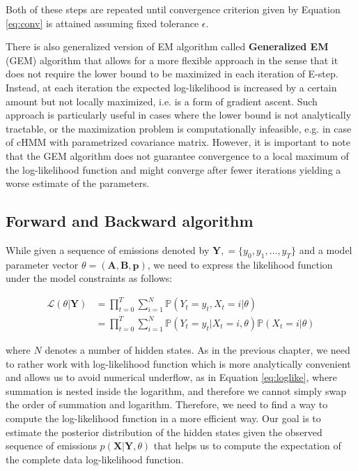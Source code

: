 Both of these steps are repeated until convergence criterion given by Equation \ref{eq:conv} is attained assuming fixed tolerance $\epsilon$.

There is also generalized version of EM algorithm called \textbf{Generalized EM} (GEM) algorithm that allows for a more flexible approach
in the sense that it does not require the lower bound to be maximized in each iteration of E-step. Instead, at each iteration
the expected log-likelihood is increased by a certain amount but not locally maximized, i.e. is a form of gradient ascent. Such approach 
is particularly useful in cases where the lower bound is not analytically tractable, or the maximization problem is computationally infeasible, e.g. in case of cHMM with 
parametrized covariance matrix. However, it is important to note that the GEM algorithm does not guarantee convergence to a local maximum 
of the log-likelihood function and might converge after fewer iterations yielding a worse estimate of the parameters. \citep{Bishop2006} 

\subsection{Forward and Backward algorithm}

While given a sequence of emissions denoted by $\textbf{Y}, = \{y_0,y_1,\ldots,y_T\}$ and a model parameter vector $\theta = (\textbf{A},\textbf{B},\textbf{p})$, 
we need to express the likelihood function under the model constraints as follows:

\begin{align} \label{eq:loglikeFB}
    \mathcal{L}( \theta| \textbf{Y}) & = \prod\limits_{t=0}^T \sum\limits_{i=1}^N  \mathbb{P}(Y_t = y_t, X_t = i| \theta) \\
                                     & = \prod\limits_{t=0}^T \sum\limits_{i=1}^N  \mathbb{P}(Y_t = y_t | X_t = i, \theta) \mathbb{P}(X_t=i|\theta)
\end{align}

where $N$ denotes a number of hidden states. As in the previous chapter, we need to rather work with log-likelihood function which is more analytically convenient 
and allows us to avoid numerical underflow, as in Equation \ref{eq:loglike}, where summation is nested inside the logarithm, and therefore we cannot simply swap the order of summation and logarithm. Therefore, we need to find a way to compute the log-likelihood function 
in a more efficient way. Our goal is to estimate the posterior distribution of the hidden states given the observed sequence of emissions $p(\textbf{X}|\textbf{Y},\theta)$
that helps us to compute the expectation of the complete data log-likelihood function.


